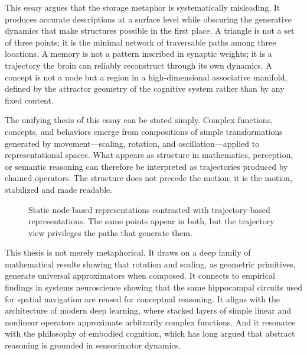 \documentclass[11pt, a4paper]{article}
\theoremstyle{plain}
\theoremstyle{definition}
\theoremstyle{remark}
\begin{document}
This essay argues that the storage metaphor is systematically misleading. It produces
accurate descriptions at a surface level while obscuring the generative dynamics that
make structures possible in the first place. A triangle is not a set of three points;
it is the minimal network of traversable paths among three locations. A memory is not
a pattern inscribed in synaptic weights; it is a trajectory the brain can reliably
reconstruct through its own dynamics. A concept is not a node but a region in a
high-dimensional associative manifold, defined by the attractor geometry of the
cognitive system rather than by any fixed content.

The unifying thesis of this essay can be stated simply. Complex functions, concepts,
and behaviors emerge from compositions of simple transformations generated by
movement---scaling, rotation, and oscillation---applied to representational spaces.
What appears as structure in mathematics, perception, or semantic reasoning can therefore
be interpreted as trajectories produced by chained operators. The structure does not
precede the motion; it is the motion, stabilized and made readable.

\begin{figure}[h]
\centering
{}
\caption{Static node-based representations contrasted with trajectory-based
representations. The same points appear in both, but the trajectory view privileges
the paths that generate them.}
\end{figure}

This thesis is not merely metaphorical. It draws on a deep family of mathematical
results showing that rotation and scaling, as geometric primitives, generate universal
approximators when composed. It connects to empirical findings in systems neuroscience
showing that the same hippocampal circuits used for spatial navigation are reused for
conceptual reasoning. It aligns with the architecture of modern deep learning, where
stacked layers of simple linear and nonlinear operators approximate arbitrarily complex
functions. And it resonates with the philosophy of embodied cognition, which has long
argued that abstract reasoning is grounded in sensorimotor dynamics.
\end{document}
